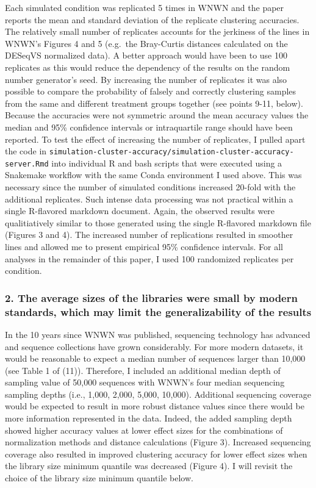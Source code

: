 \documentclass[
]{article}
\begin{document}
Each simulated condition was replicated 5 times in WNWN and the paper
reports the mean and standard deviation of the replicate clustering
accuracies. The relatively small number of replicates accounts for the
jerkiness of the lines in WNWN's Figures 4 and 5 (e.g.~the Bray-Curtis
distances calculated on the DESeqVS normalized data). A better approach
would have been to use 100 replicates as this would reduce the
dependency of the results on the random number generator's seed. By
increasing the number of replicates it was also possible to compare the
probability of falsely and correctly clustering samples from the same
and different treatment groups together (see points 9-11, below).
Because the accuracies were not symmetric around the mean accuracy
values the median and 95\% confidence intervals or intraquartile range
should have been reported. To test the effect of increasing the number
of replicates, I pulled apart the code in
\texttt{simulation-cluster-accuracy/simulation-cluster-accuracy-server.Rmd}
into individual R and bash scripts that were executed using a Snakemake
workflow with the same Conda environment I used above. This was
necessary since the number of simulated conditions increased 20-fold
with the additional replicates. Such intense data processing was not
practical within a single R-flavored markdown document. Again, the
observed results were qualitiatively similar to those generated using
the single R-flavored markdown file (Figures 3 and 4). The increased
number of replications resulted in smoother lines and allowed me to
present empirical 95\% confidence intervals. For all analyses in the
remainder of this paper, I used 100 randomized replicates per condition.

\hypertarget{the-average-sizes-of-the-libraries-were-small-by-modern-standards-which-may-limit-the-generalizability-of-the-results}{%
\subsubsection{2. The average sizes of the libraries were small by
modern standards, which may limit the generalizability of the
results}\label{the-average-sizes-of-the-libraries-were-small-by-modern-standards-which-may-limit-the-generalizability-of-the-results}}

In the 10 years since WNWN was published, sequencing technology has
advanced and sequence collections have grown considerably. For more
modern datasets, it would be reasonable to expect a median number of
sequences larger than 10,000 (see Table 1 of (11)). Therefore, I
included an additional median depth of sampling value of 50,000
sequences with WNWN's four median sequencing sampling depths (i.e.,
1,000, 2,000, 5,000, 10,000). Additional sequencing coverage would be
expected to result in more robust distance values since there would be
more information represented in the data. Indeed, the added sampling
depth showed higher accuracy values at lower effect sizes for the
combinations of normalization methods and distance calculations (Figure
3). Increased sequencing coverage also resulted in improved clustering
accuracy for lower effect sizes when the library size minimum quantile
was decreased (Figure 4). I will revisit the choice of the library size
minimum quantile below.
\end{document}
